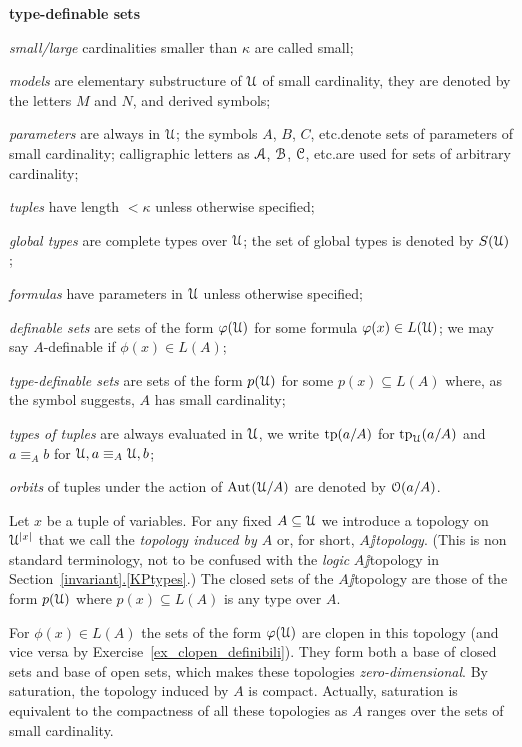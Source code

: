 \documentclass[creche.tex]{subfiles}
\begin{document}
\begin{litemize}{{\bf type-definable sets}}
\item[\emph{small/large}] cardinalities smaller than $\kappa$ are called small; 
\item[\emph{models}] are elementary substructure of $\EuScript U$ of small cardinality, they are denoted by the letters $M$ and $N$, and derived symbols;
\item[\emph{parameters}] are always in $\EuScript U$; the symbols $A$, $B$, $C$, etc.\@ denote sets of parameters of small cardinality; calligraphic letters as $\EuScript A$, $\EuScript B$, $\EuScript C$, etc.\@ are used for sets of arbitrary cardinality;
\item[\emph{tuples}]  have length $<\kappa$ unless otherwise specified;
\item[\emph{global types}] are complete types over $\EuScript U$; the set of global types is denoted by $S(\EuScript U)$;
\item[\emph{formulas}] have parameters in $\EuScript U$ unless otherwise specified;
\item[\emph{definable sets}] are sets of the form $\varphi(\EuScript U)$ for some formula $\varphi(x)\in L(\EuScript U)$; we may say $A$-definable if $\phi(x)\in L(A)$;
\item[\emph{type-definable sets}] are sets of the form $p(\EuScript U)$ for some $p(x)\subseteq L(A)$ where, as the symbol suggests, $A$ has small cardinality;
\item[\emph{types of tuples}] are always evaluated in $\EuScript U$, we write ${\rm tp}(a/A)$ for ${\rm tp}_\EuScript U(a/A)$ and $a\equiv_A b$ for $\EuScript U,a \equiv_A \EuScript U,b$; 
\item[\emph{orbits}] of tuples under the action of $\textrm{Aut\kern.15ex}(\EuScript U/A)$ are denoted by $\EuScript O(a/A)$.
\end{litemize}


Let $x$ be a tuple of variables. For any fixed $A\subseteq \EuScript U$ we introduce a topology on $\EuScript U^{|x|}$ that we call the \emph{topology induced by $A$} or, for short, \emph{$A\jj$topology}. (This is non standard terminology, not to be confused with the \textit{logic\/} $A\jj$topology in Section~\hyperref[invariant]{\ref*{invariant}.\ref*{KPtypes}}.) The closed sets of the $A\jj$topology are those of the form $p(\EuScript U)$ where $p(x)\subseteq L(A)$ is any type over $A$.

For $\phi(x)\in L(A)$ the sets of the form $\varphi(\EuScript U)$ are clopen in this topology (and vice versa by Exercise~\ref{ex_clopen_definibili}). They form both a base of closed sets and base of open sets, which makes these topologies \textit{zero-dimensional}. By saturation, the topology induced by $A$ is compact. Actually, saturation is equivalent to the compactness of all these topologies as $A$ ranges over the sets of small cardinality.
\end{document}
